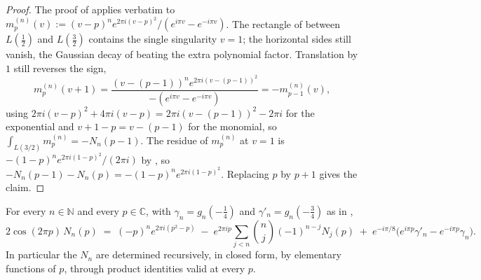 \begin{proof}
The proof of  applies verbatim to
$m^{(n)}_{p}(v):=(v-p)^{n}e^{2\pi i(v-p)^{2}}/(e^{i\pi v}-e^{-i\pi v})$.  The rectangle of
 between $L(\tfrac12)$ and $L(\tfrac32)$ contains the single singularity
$v=1$; the horizontal sides still vanish, the Gaussian decay of
 beating the extra polynomial factor.  Translation by $1$ still
reverses the sign,
\[
  m^{(n)}_{p}(v+1)=\frac{(v-(p-1))^{n}e^{2\pi i(v-(p-1))^{2}}}{-(e^{i\pi v}-e^{-i\pi v})}
  =-m^{(n)}_{p-1}(v),
\]
using $2\pi i(v-p)^{2}+4\pi i(v-p)=2\pi i(v-(p-1))^{2}-2\pi i$ for the exponential and
$v+1-p=v-(p-1)$ for the monomial, so $\int_{L(3/2)}m^{(n)}_{p}=-N_{n}(p-1)$.  The residue of
$m^{(n)}_{p}$ at $v=1$ is $-(1-p)^{n}e^{2\pi i(1-p)^{2}}/(2\pi i)$ by
, so
$-N_{n}(p-1)-N_{n}(p)=-(1-p)^{n}e^{2\pi i(1-p)^{2}}$.  Replacing $p$ by $p+1$ gives the claim.
\end{proof}

\begin{theorem}
\label{thm:rsg_closed}
For every $n\in\mathbb{N}$ and every $p\in\mathbb{C}$, with
$\gamma_{n}=g_{n}(-\tfrac14)$ and $\gamma'_{n}=g_{n}(-\tfrac34)$ as in
,
\[
  2\cos(2\pi p)\,N_{n}(p)\;=\;(-p)^{n}e^{2\pi i(p^{2}-p)}
   \;-\;e^{2\pi ip}\sum_{j<n}\binom nj(-1)^{n-j}N_{j}(p)
   \;+\;e^{-i\pi/8}\bigl(e^{i\pi p}\gamma'_{n}-e^{-i\pi p}\gamma_{n}\bigr).
\]
In particular the $N_{n}$ are determined recursively, in closed form, by elementary functions of
$p$, through product identities valid at every $p$.
\end{theorem}

